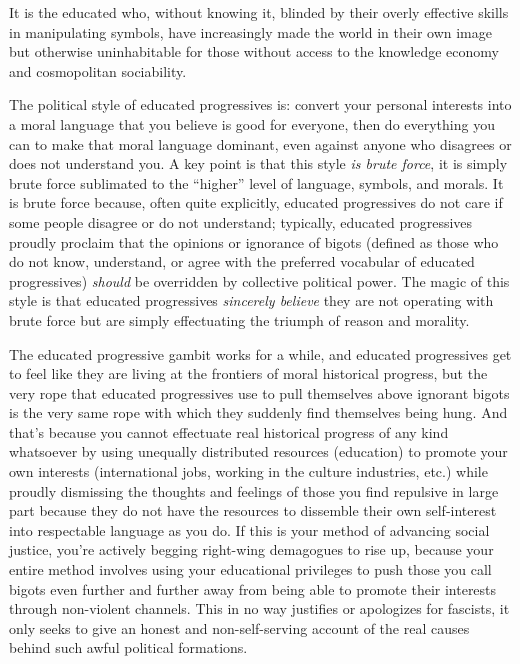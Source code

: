 \documentclass[a4paper,12pt,margin=.5in]{article}
\begin{document}
It is the educated who, without knowing it, blinded by their overly
effective skills in manipulating symbols, have increasingly made the
world in their own image but otherwise uninhabitable for those without
access to the knowledge economy and cosmopolitan sociability.

The political style of educated progressives is: convert your personal
interests into a moral language that you believe is good for everyone,
then do everything you can to make that moral language dominant, even
against anyone who disagrees or does not understand you. A key point is
that this style \emph{is brute force}, it is simply brute force
sublimated to the ``higher'' level of language, symbols, and morals. It
is brute force because, often quite explicitly, educated progressives do
not care if some people disagree or do not understand; typically,
educated progressives proudly proclaim that the opinions or ignorance of
bigots (defined as those who do not know, understand, or agree with the
preferred vocabular of educated progressives) \emph{should} be
overridden by collective political power. The magic of this style is
that educated progressives \emph{sincerely believe} they are not
operating with brute force but are simply effectuating the triumph of
reason and morality.

The educated progressive gambit works for a while, and educated
progressives get to feel like they are living at the frontiers of moral
historical progress, but the very rope that educated progressives use to
pull themselves above ignorant bigots is the very same rope with which
they suddenly find themselves being hung. And that's because you cannot
effectuate real historical progress of any kind whatsoever by using
unequally distributed resources (education) to promote your own
interests (international jobs, working in the culture industries, etc.)
while proudly dismissing the thoughts and feelings of those you find
repulsive in large part because they do not have the resources to
dissemble their own self-interest into respectable language as you do.
If this is your method of advancing social justice, you're actively
begging right-wing demagogues to rise up, because your entire method
involves using your educational privileges to push those you call bigots
even further and further away from being able to promote their interests
through non-violent channels. This in no way justifies or apologizes for
fascists, it only seeks to give an honest and non-self-serving account
of the real causes behind such awful political formations.
\end{document}
